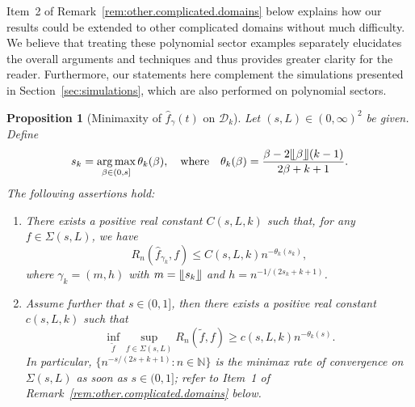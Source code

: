 \documentclass[bj,authoryear]{imsart}
\numberwithin{equation}{section}
\theoremstyle{plain}
\newtheorem{proposition}[theorem]{Proposition}
\theoremstyle{remark}
\newcommand{\N}{\mathbb{N}}
\newcommand{\1}{\mathds{1}}
\newcommand{\domain}{\mathcal{D}}
\begin{document}
    Item~2 of Remark~\ref{rem:other.complicated.domains} below explains how our results could be extended to other complicated domains without much difficulty. We believe that treating these polynomial sector examples separately elucidates the overall arguments and techniques and thus provides greater clarity for the reader. Furthermore, our statements here complement the simulations presented in Section~\ref{sec:simulations}, which are also performed on polynomial sectors.

    \begin{proposition}[Minimaxity of $\hat{f}_{\gamma}(t)$ on \texorpdfstring{$\domain_k$}{D\_k}]\label{prop:minimaxity.polynomial.sectors}
        Let $(s,L)\in (0,\infty)^2$ be given. Define
        \begin{equation}\label{eq:s.k.and.theta.k}
            s_k = \mathop{\mathrm{arg\,max}}_{\beta\in (0,s]} \theta_k(\beta),
            \quad \text{where} \quad
            \theta_k(\beta) = \frac{\beta-2\llfloor\beta\rrfloor(k-1)}{2\beta+k+1}.
        \end{equation}
        The following assertions hold:
        \begin{enumerate}
            \item There exists a positive real constant $C(s,L,k)$  such that, for any $f\in \Sigma(s,L)$, we have
                \begin{equation}\label{eq:rebroussement.upper.bound}
                    R_n(\hat{f}_{\gamma_k}, f)\leq C(s,L,k) n^{-\theta_k(s_k)},
                \end{equation}
                where $\gamma_k=(m,h)$ with $m=\llfloor s_k\rrfloor$ and $h=n^{-1/(2s_k+k+1)}$.
            \item Assume further that $s\in (0,1]$, then there exists a positive real constant $c(s,L,k)$ such that
                \begin{equation}\label{eq:rebroussement.lower.bound}
                 \inf_{\tilde{f}}\sup_{f\in \Sigma(s,L)} R_n(\tilde{f}, f)\geq c(s,L,k) n^{-\theta_k(s)}.
                \end{equation}
                In particular, $\{n^{-s/(2s+k+1)} : n\in \N\}$ is the minimax rate of convergence on $\Sigma(s,L)$ as soon as $s\in (0,1]$; refer to Item~1 of Remark~\ref{rem:other.complicated.domains} below.
        \end{enumerate}
    \end{proposition}
\end{document}
